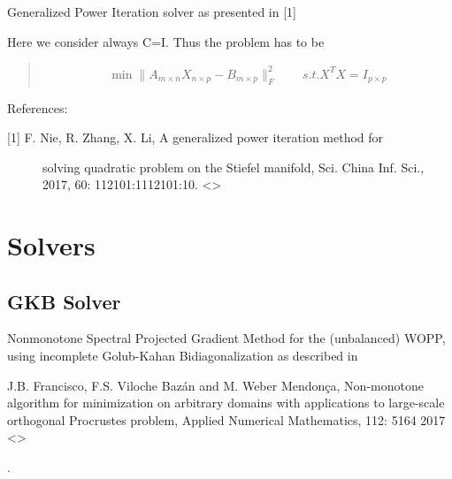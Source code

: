 \documentclass[a4paper,10pt,english]{sphinxmanual}
\begin{document}
\begin{fulllineitems}
\label{\detokenize{skprocrustes:skprocrustes.gpi_solver}}
Generalized Power Iteration solver as presented in {[}1{]}

Here we consider always C=I.
Thus the problem has to be
\begin{quote}
\begin{equation*}
\begin{split}\min \lVert A_{m\times n}X_{n\times p}-B_{m\times p}\rVert_F^2 
\qquad s.t. X^TX=I_{p\times p}    \end{split}
\end{equation*}\end{quote}

References:
\begin{description}
\item[{{[}1{]} F. Nie, R. Zhang, X. Li, A generalized power iteration method for}] \leavevmode
solving quadratic problem on the Stiefel manifold, Sci. China Inf. Sci.,
2017, 60: 112101:1\textendash{}112101:10.
\textless{}\textgreater{}

\end{description}

\end{fulllineitems}



\section{Solvers}
\label{\detokenize{solvers::doc}}\label{\detokenize{solvers:solvers}}

\subsection{GKB Solver}
\label{\detokenize{solvers:gkb-solver}}\label{\detokenize{solvers:gkb}}
Nonmonotone Spectral Projected Gradient Method for the (unbalanced) WOPP, using incomplete Golub-Kahan Bidiagonalization as described in %
\begin{footnote}[2]\sphinxAtStartFootnote
J.B. Francisco, F.S. Viloche Bazán and M. Weber Mendonça, Non-monotone algorithm for minimization on arbitrary domains with applications to large-scale orthogonal Procrustes problem, Applied Numerical Mathematics, 112: 51\textendash{}64 2017 \textless{}\textgreater{}
%
\end{footnote}.
\end{document}
